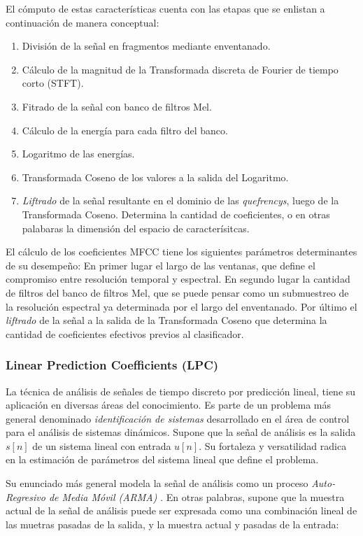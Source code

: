 \documentclass{article}
\begin{document}
El cómputo de estas características cuenta con las etapas que se enlistan a continuación de manera conceptual: 

\begin{enumerate}
	\item División de la señal en fragmentos mediante enventanado.
	\item Cálculo de la magnitud de la Transformada discreta de Fourier de tiempo corto (STFT).
	\item Fitrado de la señal con banco de filtros Mel.
	\item Cálculo de la energía para cada filtro del banco.
	\item Logaritmo de las energías.
	\item Transformada Coseno de los valores a la salida del Logaritmo.
	\item \textit{Liftrado} de la señal resultante en el dominio de las \textit{quefrencys}, luego de la Transformada Coseno. Determina la cantidad de coeficientes, o en otras palabaras la dimensión del espacio de caracterísitcas.
\end{enumerate}

El cálculo de los coeficientes MFCC tiene los siguientes parámetros determinantes de su desempeño: En primer lugar el largo de las ventanas, que define el compromiso entre resolución temporal y espectral. En segundo lugar la cantidad de filtros del banco de filtros Mel, que se puede pensar como un submuestreo de la resolución espectral ya determinada por el largo del enventanado. Por último el \textit{liftrado} de la señal a la salida de la Transformada Coseno que determina la cantidad de coeficientes efectivos previos al clasificador.
\medskip


\subsubsection{Linear Prediction Coefficients (LPC)}

La técnica de análisis de señales de tiempo discreto por predicción lineal, tiene su aplicación en diversas áreas del conocimiento. Es parte de un problema más general denominado \textit{identificación de sistemas} desarrollado en el área de control para el análisis de sistemas dinámicos. Supone que la señal de análisis es la salida $s[n]$ de un sistema lineal con entrada $u[n]$. Su fortaleza y versatilidad radica en la estimación de parámetros del sistema lineal que define el problema. 
\medskip

Su enunciado más general modela la señal de análisis como un proceso \textit{Auto-Regresivo de Media Móvil (ARMA)} \citep{makhoul1975linear}. En otras palabras, supone que la muestra actual de la señal de análisis puede ser expresada como una combinación lineal de las muetras pasadas de la salida, y la muestra actual y pasadas de la entrada: 
\end{document}
